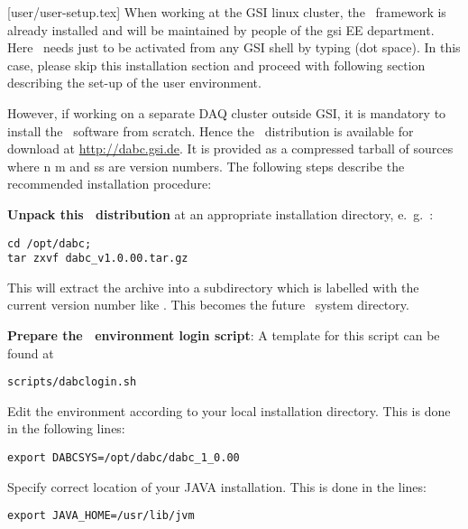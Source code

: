[user/user-setup.tex]
\label{user-setup-chapter}
When working at the GSI linux cluster, the \dabc\ framework is already installed and will
be maintained by people of the gsi EE department. Here \dabc\ needs just to be
activated from any GSI shell by typing  (dot space). In this case, 
please skip this installation section and proceed with following section  describing
the set-up of the user environment.

However, if working on a separate DAQ cluster outside GSI, 
it is mandatory to install the \dabc\ software
from scratch. 
Hence the \dabc\ distribution is available for download at \hyperref{http://dabc.gsi.de}{}{}{http://dabc.gsi.de}.
It is provided as a compressed tarball of sources 
where n m and ss are version numbers.
The following steps describe the recommended installation procedure:

\bnum
\item {\bf Unpack this \dabc\ distribution} at an appropriate installation directory,
e.~g.~:
\begin{small}
\begin{verbatim}
cd /opt/dabc; 
tar zxvf dabc_v1.0.00.tar.gz
\end{verbatim}
\end{small}
This will extract the archive into a subdirectory which is labelled
with the current version number like .
This becomes the future \dabc\ system directory.

\item {\bf Prepare the \dabc\ environment login script}:
A template for this script can be found at  
\begin{small}
\begin{verbatim}
scripts/dabclogin.sh
\end{verbatim}
\end{small}

\bbul
\item Edit the  environment according to your local installation directory. 
This is done in the following lines:
\begin{small}
\begin{verbatim}
export DABCSYS=/opt/dabc/dabc_1_0.00  
\end{verbatim}  
\end{small}
\item Specify correct location of your JAVA installation. This is done in the lines:
\begin{small}
\begin{verbatim}
export JAVA_HOME=/usr/lib/jvm
\end{verbatim}  
\end{small}

